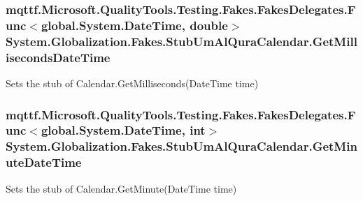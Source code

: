 \hypertarget{class_system_1_1_globalization_1_1_fakes_1_1_stub_um_al_qura_calendar_a9493c2968bfa51331a46655cac5825ce}{
\subsubsection[{Get\-Milliseconds\-Date\-Time}]{\setlength{\rightskip}{0pt plus 5cm}mqttf.\-Microsoft.\-Quality\-Tools.\-Testing.\-Fakes.\-Fakes\-Delegates.\-Func$<$global.\-System.\-Date\-Time, double$>$ System.\-Globalization.\-Fakes.\-Stub\-Um\-Al\-Qura\-Calendar.\-Get\-Milliseconds\-Date\-Time}}\label{class_system_1_1_globalization_1_1_fakes_1_1_stub_um_al_qura_calendar_a9493c2968bfa51331a46655cac5825ce}


Sets the stub of Calendar.\-Get\-Milliseconds(\-Date\-Time time)

\hypertarget{class_system_1_1_globalization_1_1_fakes_1_1_stub_um_al_qura_calendar_a94011ff246509a1beb99a3312c6e6c4a}{
\subsubsection[{Get\-Minute\-Date\-Time}]{\setlength{\rightskip}{0pt plus 5cm}mqttf.\-Microsoft.\-Quality\-Tools.\-Testing.\-Fakes.\-Fakes\-Delegates.\-Func$<$global.\-System.\-Date\-Time, int$>$ System.\-Globalization.\-Fakes.\-Stub\-Um\-Al\-Qura\-Calendar.\-Get\-Minute\-Date\-Time}}\label{class_system_1_1_globalization_1_1_fakes_1_1_stub_um_al_qura_calendar_a94011ff246509a1beb99a3312c6e6c4a}


Sets the stub of Calendar.\-Get\-Minute(\-Date\-Time time)

